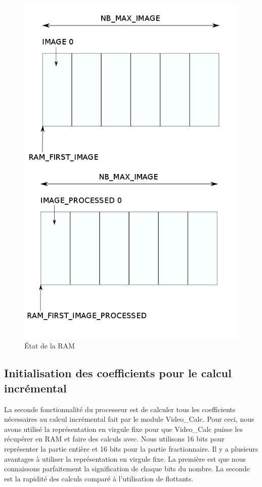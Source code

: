 \documentclass[a4paper,12pt]{report}
\begin{document}
{{{\begin{figure}[!h]
	\centering
	\includegraphics[scale = 0.3]{ram_management.png}
	\caption{État de la RAM}
\end{figure}

}

			\subsection*{Initialisation des coefficients pour le calcul incrémental}

{La seconde fonctionnalité du processeur est de calculer tous les coefficients nécessaires au calcul incrémental fait par le module Video\_Calc. Pour ceci, nous avons utilisé la représentation en virgule fixe pour que Video\_Calc puisse les récupérer en RAM et faire des calculs avec. Nous utilisons 16 bits pour représenter la partie entière et 16 bits pour la partie fractionnaire. Il y a plusieurs avantages à utiliser la représentation en virgule fixe. La première est que nous connaissons parfaitement la signification de chaque bits du nombre. La seconde est la rapidité des calculs comparé à l'utilisation de flottants.


}}}
\end{document}
